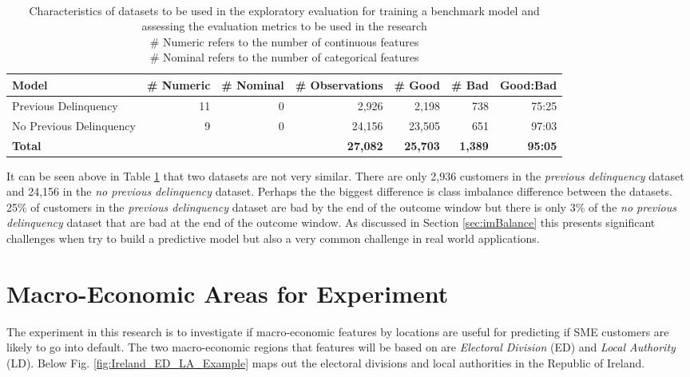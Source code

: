 \begin{table}[H]
	\centering\
	\resizebox{\textwidth}{!}
	{
		\begin{tabular}{l r r r r r r}
			\hline
			\textbf{Model} &  \textbf{\# Numeric} & \textbf{\# Nominal} & \textbf{\# Observations} & \textbf{\# Good} & \textbf{\# Bad} & \textbf{Good:Bad}\\
			\hline
			Previous Delinquency & 11 & 0 & 2,926 & 2,198  & 738 & 75:25 \\ 
			No Previous Delinquency & 9 & 0 & 24,156 & 23,505 & 651  & 97:03 \\ \hline
			\textbf{Total} &  &  & \textbf{27,082} & \textbf{25,703} & \textbf{1,389} & \textbf{95:05} \\ \hline
		\end{tabular}
	}
	\caption{Characteristics of datasets to be used in the exploratory evaluation for training a benchmark model and assessing the evaluation metrics to be used in the research \\
		 \# Numeric refers to the number of continuous features \\
		 \# Nominal refers to the number of categorical features
		}
	\label{characteristicsDatasets}
\end{table}

It can be seen above in Table \ref{characteristicsDatasets} that two datasets are not very similar. There are only 2,936 customers in the \textit{previous delinquency} dataset and 24,156 in the \textit{no previous delinquency} dataset. Perhaps the the biggest difference is class imbalance difference between the datasets. 25\% of customers in the \textit{previous delinquency} dataset are bad by the end of the outcome window but there is only 3\% of the \textit{no previous delinquency} dataset that are bad at the end of the outcome window. As discussed in Section \ref{sec:imBalance} this presents significant challenges when try to build a predictive model but also a very common challenge in real world applications. 


\section{Macro-Economic Areas for Experiment}
The experiment in this research is to investigate if macro-economic features by locations are useful for predicting if SME customers are likely to go into default. The two macro-economic regions that features will be based on are \textit{Electoral Division} (ED) and \textit{Local Authority} (LD). Below Fig. \ref{fig:Ireland_ED_LA_Example} maps out the electoral divisions and local authorities in the Republic of Ireland.

